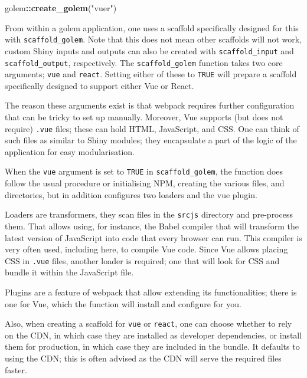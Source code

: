 \documentclass[10pt,]{krantz}
\makeatletter
\newenvironment{Shaded}{\begin{snugshade}}{\end{snugshade}}
\newcommand{\KeywordTok}[1]{\textcolor[rgb]{0.27,0.27,0.27}{\textbf{#1}}}
\newcommand{\NormalTok}[1]{#1}
\newcommand{\OperatorTok}[1]{\textcolor[rgb]{0.43,0.43,0.43}{\textbf{#1}}}
\newcommand{\StringTok}[1]{\textcolor[rgb]{0.5,0.5,0.5}{#1}}
\newenvironment{kframe}{%
\medskip{}
\setlength{\fboxsep}{.8em}
 \def\at@end@of@kframe{}%
 \ifinner\ifhmode%
  \def\at@end@of@kframe{\end{minipage}}%
  \begin{minipage}{\columnwidth}%
 \fi\fi%
 \def\FrameCommand##1{\hskip\@totalleftmargin \hskip-\fboxsep
 \colorbox{shadecolor}{##1}\hskip-\fboxsep
     \hskip-\linewidth \hskip-\@totalleftmargin \hskip\columnwidth}%
 \MakeFramed {\advance\hsize-\width
   \@totalleftmargin\z@ \linewidth\hsize
   \@setminipage}}%
 {\par\unskip\endMakeFramed%
 \at@end@of@kframe}
\renewenvironment{Shaded}{\begin{kframe}}{\end{kframe}}
\makeatother
\begin{document}
\begin{Shaded}
\begin{Highlighting}[]
\NormalTok{golem}\OperatorTok{::}\KeywordTok{create_golem}\NormalTok{(}\StringTok{"vuer"}\NormalTok{)}
\end{Highlighting}
\end{Shaded}

From within a golem application, one uses a scaffold specifically designed for this with \texttt{scaffold\_golem}. Note that this does not mean other scaffolds will not work, custom Shiny inputs and outputs can also be created with \texttt{scaffold\_input} and \texttt{scaffold\_output}, respectively. The \texttt{scaffold\_golem} function takes two core arguments; \texttt{vue} and \texttt{react}. Setting either of these to \texttt{TRUE} will prepare a scaffold specifically designed to support either Vue or React.

The reason these arguments exist is that webpack requires further configuration that can be tricky to set up manually. Moreover, Vue supports (but does not require) \texttt{.vue} files; these can hold HTML, JavaScript, and CSS. One can think of such files as similar to Shiny modules; they encapsulate a part of the logic of the application for easy modularisation.

When the \texttt{vue} argument is set to \texttt{TRUE} in \texttt{scaffold\_golem}, the function does follow the usual procedure or initialising NPM, creating the various files, and directories, but in addition configures two loaders and the vue plugin.

Loaders are transformers, they scan files in the \texttt{srcjs} directory and pre-process them. That allows using, for instance, the Babel compiler that will transform the latest version of JavaScript into code that every browser can run. This compiler is very often used, including here, to compile Vue code. Since Vue allows placing CSS in \texttt{.vue} files, another loader is required; one that will look for CSS and bundle it within the JavaScript file.

Plugins are a feature of webpack that allow extending its functionalities; there is one for Vue, which the function will install and configure for you.

Also, when creating a scaffold for \texttt{vue} or \texttt{react}, one can choose whether to rely on the CDN, in which case they are installed as developer dependencies, or install them for production, in which case they are included in the bundle. It defaults to using the CDN; this is often advised as the CDN will serve the required files faster.
\end{document}
